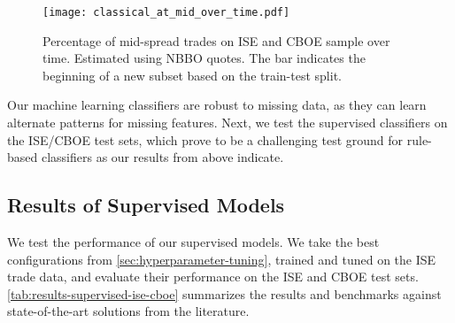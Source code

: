 \begin{figure}[!h]
    \centering
    \texttt{[image: classical\_at\_mid\_over\_time.pdf]}
    \caption[Mid-Spread Trades Over Time]{Percentage of mid-spread trades on \gls{ISE} and \gls{CBOE} sample over time. Estimated using \gls{NBBO} quotes. The bar \myline{} indicates the beginning of a new subset based on the train-test split.}
    \label{fig:classical-at-mid-over-time}
\end{figure}

Our machine learning classifiers are robust to missing data, as they can learn alternate patterns for missing features. Next, we test the supervised classifiers on the \gls{ISE}/\gls{CBOE} test sets, which prove to be a challenging test ground for rule-based classifiers as our results from above indicate.

\subsection{Results of Supervised
    Models}\label{sec:results-of-supervised-models}

We test the performance of our supervised models. We take the best configurations from \cref{sec:hyperparameter-tuning}, trained and tuned on the \gls{ISE} trade data, and evaluate their performance on the \gls{ISE} and \gls{CBOE} test sets. \cref{tab:results-supervised-ise-cboe} summarizes the results and benchmarks against state-of-the-art solutions from the literature.

